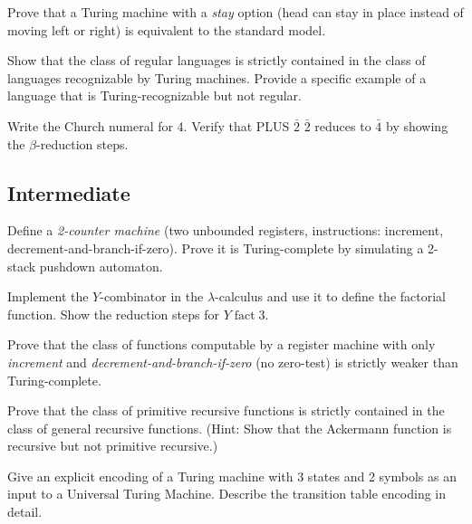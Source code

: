 \begin{exercise}[Basic]
Prove that a Turing machine with a \emph{stay} option (head can stay in place instead of moving left or right) is equivalent to the standard model.
\end{exercise}

\begin{exercise}[Basic]
Show that the class of regular languages is strictly contained in the class of languages recognizable by Turing machines. Provide a specific example of a language that is Turing-recognizable but not regular.
\end{exercise}

\begin{exercise}[Basic]
Write the Church numeral for 4. Verify that PLUS $\bar{2}$ $\bar{2}$ reduces to $\bar{4}$ by showing the $\beta$-reduction steps.
\end{exercise}

\subsection*{Intermediate}

\begin{exercise}[Intermediate]
Define a \emph{2-counter machine} (two unbounded registers, instructions: increment, decrement-and-branch-if-zero). Prove it is Turing-complete by simulating a 2-stack pushdown automaton.
\end{exercise}

\begin{exercise}[Intermediate]
Implement the $Y$-combinator in the $\lambda$-calculus and use it to define the factorial function. Show the reduction steps for $Y\;\text{fact}\;3$.
\end{exercise}

\begin{exercise}[Intermediate]
Prove that the class of functions computable by a register machine with only \emph{increment} and \emph{decrement-and-branch-if-zero} (no zero-test) is strictly weaker than Turing-complete.
\end{exercise}

\begin{exercise}[Intermediate]
Prove that the class of primitive recursive functions is strictly contained in the class of general recursive functions. (Hint: Show that the Ackermann function is recursive but not primitive recursive.)
\end{exercise}

\begin{exercise}[Intermediate]
Give an explicit encoding of a Turing machine with 3 states and 2 symbols as an input to a Universal Turing Machine. Describe the transition table encoding in detail.
\end{exercise}

